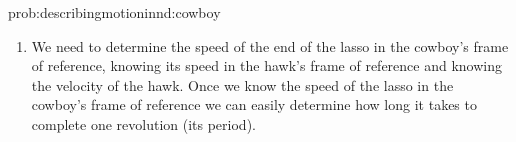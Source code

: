 \newpage
\begin{solution}{prob:describingmotioninnd:cowboy}\label{soln:describingmotioninnd:cowboy}
\begin{enumerate}[label=\alph*)]
\item We need to determine the speed of the end of the lasso in the cowboy's frame of reference, knowing its speed in the hawk's frame of reference and knowing the velocity of the hawk. Once we know the speed of the lasso in the cowboy's frame of reference we can easily determine how long it takes to complete one revolution (its period). \\





\end{enumerate}
\end{solution}
